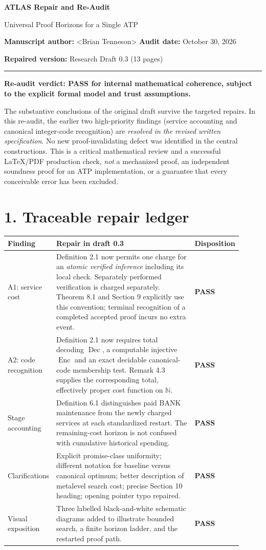 \documentclass[11pt,letterpaper]{article}
\newcommand{\PASS}{\textbf{PASS}}
\begin{document}
{\LARGE\bfseries ATLAS Repair and Re-Audit}\par
{\large Universal Proof Horizons for a Single ATP}\par
\textbf{Manuscript author:} \textless Brian Tenneson\textgreater\qquad
\textbf{Audit date:} October 30, 2026\par
\textbf{Repaired version:} Research Draft 0.3 (13 pages)\par
\vspace{4pt}\hrule\vspace{8pt}

\textbf{Re-audit verdict: PASS for internal mathematical coherence, subject to the explicit formal model and trust assumptions.}

The substantive conclusions of the original draft survive the targeted repairs. In this re-audit, the earlier two high-priority findings (service accounting and canonical integer-code recognition) are \emph{resolved in the revised written specification}. No new proof-invalidating defect was identified in the central constructions. This is a critical mathematical review and a successful LaTeX/PDF production check, \emph{not} a mechanized proof, an independent soundness proof for an ATP implementation, or a guarantee that every conceivable error has been excluded.

\section*{1. Traceable repair ledger}
\renewcommand{\arraystretch}{1.07}
\begin{tabularx}{\linewidth}{@{}p{0.14\linewidth}p{0.59\linewidth}p{0.18\linewidth}@{}}
\toprule
\textbf{Finding} & \textbf{Repair in draft 0.3} & \textbf{Disposition}\\\midrule
A1: service cost & Definition 2.1 now permits one charge for an \emph{atomic verified inference} including its local check. Separately performed verification is charged separately. Theorem 8.1 and Section 9 explicitly use this convention; terminal recognition of a completed accepted proof incurs no extra event. & \PASS\\
A2: code recognition & Definition 2.1 now requires total decoding $\operatorname{Dec}$, a computable injective $\operatorname{Enc}$ and an exact decidable canonical-code membership test. Remark 4.3 supplies the corresponding total, effectively proper cost function on $\mathbb N$. & \PASS\\
Stage accounting & Definition 6.1 distinguishes paid BANK maintenance from the newly charged services at each standardized restart. The remaining-cost horizon is not confused with cumulative historical spending. & \PASS\\
Clarifications & Explicit promise-class uniformity; different notation for baseline versus canonical optimum; better description of metalevel search cost; precise Section 10 heading; opening pointer typo repaired. & \PASS\\
Visual exposition & Three labelled black-and-white schematic diagrams added to illustrate bounded search, a finite horizon ladder, and the restarted proof path. & \PASS\\
\bottomrule
\end{tabularx}
\end{document}
